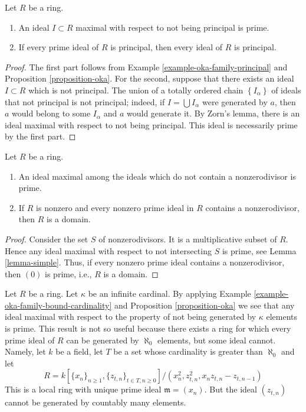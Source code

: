 \begin{lemma}
\label{lemma-primes-principal}
Let $R$ be a ring.
\begin{enumerate}
\item An ideal $I \subset R$ maximal with respect to not being
principal is prime.
\item If every prime ideal of $R$ is principal, then
every ideal of $R$ is principal.
\end{enumerate}
\end{lemma}

\begin{proof}
The first part follows from
Example \ref{example-oka-family-principal} and
Proposition \ref{proposition-oka}.
For the second, suppose that there exists an ideal $I \subset R$
which is not principal. The union of a totally ordered chain
$\left\{I_\alpha\right\}$ of ideals that not principal is not principal;
indeed, if $I = \bigcup I_\alpha$ were generated by
$a$, then $a$ would belong to some $I_\alpha $ and $a$ would generate it.
By Zorn's lemma, there is an ideal maximal with respect to not being
principal. This ideal is necessarily prime by the first part.
\end{proof}

\begin{lemma}
\label{lemma-characterize-domain}
Let $R$ be a ring.
\begin{enumerate}
\item An ideal maximal among the ideals which do not contain a
nonzerodivisor is prime.
\item If $R$ is nonzero and every nonzero prime ideal in $R$
contains a nonzerodivisor, then $R$ is a domain.
\end{enumerate}
\end{lemma}

\begin{proof}
Consider the set $S$ of nonzerodivisors. It is a multiplicative
subset of $R$. Hence any ideal maximal with respect to not intersecting
$S$ is prime, see
Lemma \ref{lemma-simple}.
Thus, if every nonzero prime ideal contains a nonzerodivisor, then
$(0)$ is prime, i.e., $R$ is a domain.
\end{proof}

\begin{remark}
\label{remark-cohen-bound-cardinality}
Let $R$ be a ring. Let $\kappa$ be an infinite cardinal.
By applying
Example \ref{example-oka-family-bound-cardinality} and
Proposition \ref{proposition-oka}
we see that any ideal maximal with respect to the property of not being
generated by $\kappa$ elements is prime. This result is not so
useful because there exists a ring for which every prime ideal
of $R$ can be generated by $\aleph_0$ elements, but some
ideal cannot. Namely, let $k$ be a field, let $T$ be a set whose
cardinality is greater than $\aleph_0$ and let
$$
R = k[\{x_n\}_{n \geq 1}, \{z_{t, n}\}_{t \in T, n \geq 0}]/
(x_n^2, z_{t, n}^2, x_n z_{t, n} - z_{t, n - 1})
$$
This is a local ring with unique prime ideal
$\mathfrak m = (x_n)$. But the ideal $(z_{t, n})$ cannot
be generated by countably many elements.
\end{remark}

